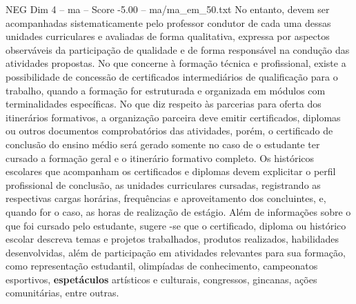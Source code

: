 \begin{textsample}{NEG Dim 4 – ma – Score -5.00 – ma/ma\_em\_50.txt}
No entanto, devem ser acompanhadas sistematicamente pelo professor condutor de cada uma dessas unidades curriculares e avaliadas de forma qualitativa, expressa por aspectos observáveis da participação de qualidade e de forma responsável na condução das atividades propostas.
No que concerne à formação técnica e profissional, existe a possibilidade de concessão de certificados intermediários de qualificação para o trabalho, quando a formação for estruturada e organizada em módulos com terminalidades específicas.
No que diz respeito às parcerias para oferta dos itinerários formativos, a organização parceira deve emitir certificados, diplomas ou outros documentos comprobatórios das atividades, porém, o certificado de conclusão do ensino médio será gerado somente no caso de o estudante ter cursado a formação geral e o itinerário formativo completo.
Os históricos escolares que acompanham os certificados e diplomas devem explicitar o perfil profissional de conclusão, as unidades curriculares cursadas, registrando as respectivas cargas horárias, frequências e aproveitamento dos concluintes, e, quando for o caso, as horas de realização de estágio.
Além de informações sobre o que foi cursado pelo estudante, sugere -se que o certificado, diploma ou histórico escolar descreva temas e projetos trabalhados, produtos realizados, habilidades desenvolvidas, além de participação em atividades relevantes para sua formação, como representação estudantil, olimpíadas de conhecimento, campeonatos esportivos, \textbf{espetáculos} artísticos e culturais, congressos, gincanas, ações comunitárias, entre outras.

\end{textsample}
